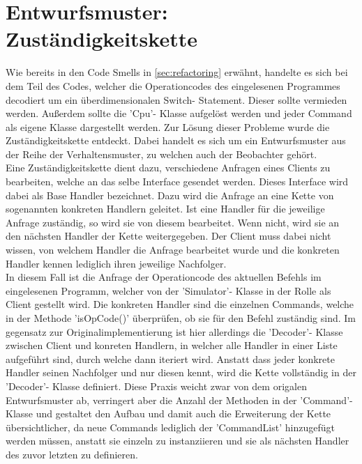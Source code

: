 \documentclass[12pt,a4paper,titlepage,ngerman,pdftex]{report}
\begin{document}
    \section{Entwurfsmuster: Zuständigkeitskette}\label{sec:entwurfsmuster}

    Wie bereits in den Code Smells in \autoref{sec:refactoring} erwähnt, handelte es sich bei dem Teil des Codes, welcher die Operationcodes des eingelesenen Programmes decodiert um ein überdimensionalen Switch- Statement.
    Dieser sollte vermieden werden. Außerdem sollte die 'Cpu'- Klasse aufgelöst werden und jeder Command als eigene Klasse dargestellt werden. Zur Lösung dieser Probleme wurde die Zuständigkeitskette entdeckt.
    Dabei handelt es sich um ein Entwurfsmuster aus der Reihe der Verhaltensmuster, zu welchen auch der Beobachter gehört. 
    \\
    Eine Zuständigkeitskette dient dazu, verschiedene Anfragen eines Clients zu bearbeiten, welche an das selbe Interface gesendet werden. Dieses Interface wird dabei als Base Handler bezeichnet. Dazu wird die Anfrage an eine Kette von sogenannten konkreten Handlern geleitet.
    Ist eine Handler für die jeweilige Anfrage zuständig, so wird sie von diesem bearbeitet. Wenn nicht, wird sie an den nächsten Handler der Kette weitergegeben. Der Client muss dabei nicht wissen, von welchem Handler die Anfrage bearbeitet wurde und die konkreten Handler kennen lediglich ihren jeweilige Nachfolger.
    \\
    In diesem Fall ist die Anfrage der Operationcode des aktuellen Befehls im eingelesenen Programm, welcher von der 'Simulator'- Klasse in der Rolle als Client gestellt wird. Die konkreten Handler sind die einzelnen Commands, welche in der Methode 'isOpCode()' überprüfen, ob sie für den Befehl zuständig sind.
    Im gegensatz zur Originalimplementierung ist hier allerdings die 'Decoder'- Klasse zwischen Client und konreten Handlern, in welcher alle Handler in einer Liste aufgeführt sind, durch welche dann iteriert wird. Anstatt dass jeder konkrete Handler seinen Nachfolger und nur diesen kennt, wird die Kette vollständig in der 'Decoder'- Klasse definiert.
    Diese Praxis weicht zwar von dem origalen Entwurfsmuster ab, verringert aber die Anzahl der Methoden in der 'Command'-Klasse und gestaltet den Aufbau und damit auch die Erweiterung der Kette übersichtlicher, da neue Commands lediglich der 'CommandList' hinzugefügt werden müssen,
    anstatt sie einzeln zu instanziieren und sie als nächsten Handler des zuvor letzten zu definieren.
\end{document}
